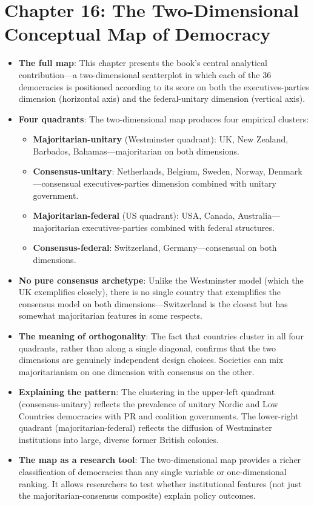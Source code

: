 \documentclass[12pt]{article}
\begin{document}
\section{Chapter 16: The Two-Dimensional Conceptual Map of Democracy}

\begin{itemize}[leftmargin=*, itemsep=4pt]
    \item \textbf{The full map}: This chapter presents the book's central analytical contribution---a two-dimensional scatterplot in which each of the 36 democracies is positioned according to its score on both the executives-parties dimension (horizontal axis) and the federal-unitary dimension (vertical axis).
    \item \textbf{Four quadrants}: The two-dimensional map produces four empirical clusters:
        \begin{itemize}
            \item \textbf{Majoritarian-unitary} (Westminster quadrant): UK, New Zealand, Barbados, Bahamas---majoritarian on both dimensions.
            \item \textbf{Consensus-unitary}: Netherlands, Belgium, Sweden, Norway, Denmark---consensual executives-parties dimension combined with unitary government.
            \item \textbf{Majoritarian-federal} (US quadrant): USA, Canada, Australia---majoritarian executives-parties combined with federal structures.
            \item \textbf{Consensus-federal}: Switzerland, Germany---consensual on both dimensions.
        \end{itemize}
    \item \textbf{No pure consensus archetype}: Unlike the Westminster model (which the UK exemplifies closely), there is no single country that exemplifies the consensus model on both dimensions---Switzerland is the closest but has somewhat majoritarian features in some respects.
    \item \textbf{The meaning of orthogonality}: The fact that countries cluster in all four quadrants, rather than along a single diagonal, confirms that the two dimensions are genuinely independent design choices. Societies can mix majoritarianism on one dimension with consensus on the other.
    \item \textbf{Explaining the pattern}: The clustering in the upper-left quadrant (consensus-unitary) reflects the prevalence of unitary Nordic and Low Countries democracies with PR and coalition governments. The lower-right quadrant (majoritarian-federal) reflects the diffusion of Westminster institutions into large, diverse former British colonies.
    \item \textbf{The map as a research tool}: The two-dimensional map provides a richer classification of democracies than any single variable or one-dimensional ranking. It allows researchers to test whether institutional features (not just the majoritarian-consensus composite) explain policy outcomes.
\end{itemize}
\end{document}
